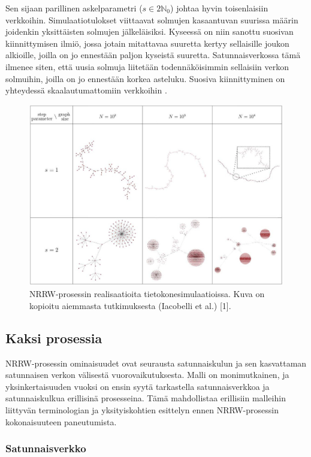\documentclass[finnish, 12pt, a4paper, sci, utf8, pdfa]{aaltothesis}
\newcommand{\N}{\mathbb{N}}
\begin{document}
Sen sijaan parillinen askelparametri (\( s \in 2\N_{0} \)) johtaa hyvin toisenlaisiin verkkoihin. Simulaatiotulokset viittaavat solmujen kasaantuvan suurissa määrin joidenkin yksittäisten solmujen jälkeläisiksi. Kyseessä on niin sanottu suosivan kiinnittymisen ilmiö, jossa jotain mitattavaa suuretta kertyy sellaisille joukon alkioille, joilla on jo ennestään paljon kyseistä suuretta. Satunnaisverkossa tämä ilmenee siten, että uusia solmuja liitetään todennäköisimmin sellaisiin verkon solmuihin, joilla on jo ennestään korkea asteluku. Suosiva kiinnittyminen on yhteydessä skaalautumattomiin verkkoihin \cite{Babarasi}.

\begin{figure}[htb]
\centering
\includegraphics[width=.9\textwidth]{pictures/simulations.jpg}
   \caption{NRRW-prosessin realisaatioita tietokonesimulaatioissa. Kuva on kopioitu aiemmasta tutkimuksesta (Iacobelli et al.) [1]. \label{simulaatiot}}
\end{figure}

\subsection{Kaksi prosessia}

NRRW-prosessin ominaisuudet ovat seurausta satunnaiskulun ja sen kasvattaman satunnaisen verkon välisestä vuorovaikutuksesta. Malli on monimutkainen, ja yksinkertaisuuden vuoksi on ensin syytä tarkastella satunnaisverkkoa ja satunnaiskulkua erillisinä prosesseina. Tämä mahdollistaa erillisiin malleihin liittyvän terminologian ja yksityiskohtien esittelyn ennen NRRW-prosessin kokonaisuuteen paneutumista.

\subsubsection{Satunnaisverkko}
\end{document}

